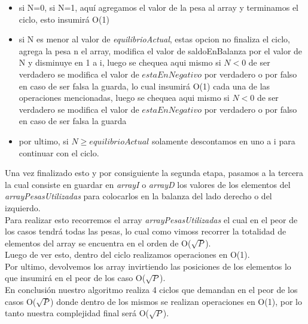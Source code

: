 \begin{itemize}
\item si N=0, si N=1, aqu\'i agregamos el valor de la pesa al array y terminamos el ciclo, esto insumir\'a O(1)
 \item si N es menor al valor de \textit{equilibrioActual}, estas opcion no finaliza el ciclo,
 agrega la pesa n el array, modifica el valor de saldoEnBalanza por el valor de N y disminuye en 1 a i, luego se chequea aqui mismo si $N < 0$ de ser verdadero se modifica el valor de $estaEnNegativo$ por verdadero o por falso en caso de ser falsa la guarda, lo cual insumir\'a O(1) cada una de las operaciones mencionadas, luego se chequea aqui mismo si $N < 0$ de ser verdadero se modifica el valor de $estaEnNegativo$ por verdadero o por falso en caso de ser falsa la guarda
 \item por ultimo, si $N \geq equilibrioActual$ solamente descontamos en uno a i para continuar con el ciclo.
\end{itemize} 
Una vez finalizado esto y por consiguiente la segunda etapa, pasamos a la tercera la cual consiste en guardar en \textit{arrayI} o \textit{arrayD} los valores de los elementos del \textit{arrayPesasUtilizadas} para colocarlos en la balanza del lado derecho o del izquierdo.\\
Para realizar esto recorremos el array \textit{arrayPesasUtilizadas} el cual en el peor de los casos tendr\'a todas las pesas, lo cual como vimoss recorrer la totalidad de elementos del array se encuentra en el orden de O($\sqrt{P}$).\\

Luego de ver esto, dentro del ciclo realizamos operaciones en O(1).\\
Por ultimo, devolvemos los array invirtiendo las posiciones de los elementos lo que insumir\'a en el peor de los caso O($\sqrt{P}$).\\

En conclusi\'on nuestro algoritmo realiza 4 ciclos que demandan en el peor de los casos O($\sqrt{P}$) donde dentro de los mismos se realizan operaciones en O(1), por lo tanto nuestra complejidad final ser\'a
O($\sqrt{P}$).




